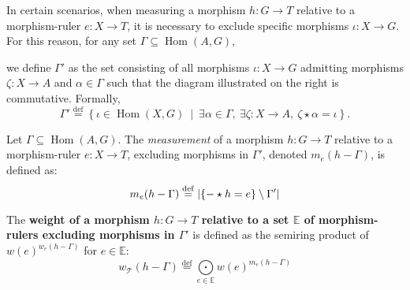 In certain scenarios, when measuring a morphism $h :G\to T$ relative to a morphism-ruler $e:X \to T$, it is necessary to exclude specific morphisms $\iota :X \to G$. For this reason, for any set \( \Gamma \subseteq \operatorname{Hom}(A, G) \),

\noindent
\begin{minipage}{0.6\textwidth}
    we define $\Gamma'$ as the set consisting of all morphisms \( \iota : X \to G \) admitting morphisms \( \zeta \colon X \to A \) and \( \alpha \in \Gamma \) such that the diagram illustrated on the right is commutative. Formally,  
    \[
    \Gamma' \overset{\operatorname{def}}{=} \left\{ \iota \in \operatorname{Hom}(X, G)~\middle|~\exists \alpha \in \Gamma,~\exists \zeta:X \to A,~\zeta \star \alpha = \iota \right\}. 
    \]
\end{minipage}
\begin{minipage}{0.4\textwidth}
    \hfill 
\end{minipage}

\begin{definition}
    \label{def:weight_excluding_pre}
    Let \( \Gamma \subseteq \operatorname{Hom}(A, G) \).
    The \emph{measurement} of a morphism \( h:G \to T \) relative to a morphism-ruler \( e: X \to T \), excluding morphisms in \( \Gamma' \), denoted $m_e(h-\Gamma)$, is defined as:
    \[
        m_e(h-\Gamma) \overset{\operatorname{def}}{=} 
            |\{- \star h = e\} \setminus \Gamma'|
    \]
\end{definition}
\begin{definition}
    \label{def:weight_excluding}
    The \textbf{weight of a morphism $h: G \to T$ relative to a set $\mathbb{E}$ of morphism-rulers excluding morphisms in \( \Gamma' \)} is defined as the semiring product of $w(e)^{w_e(h-\Gamma)}$ for $e \in \mathbb{E}$:
    \[ 
        w_\mathcal{T}(h-\Gamma) \overset{\operatorname{def}}{=} \underset{e \in \mathbb{E}}{\bigodot} 
    w(e)^{m_e(h-\Gamma)}
            \]
\end{definition}


